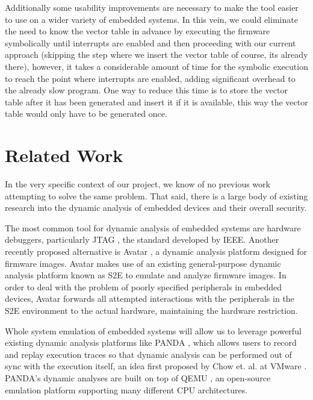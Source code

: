 \documentclass[letterpaper, 10 pt, conference]{ieeeconf}
\begin{document}
Additionally some usability improvements are necessary to make the tool easier to use on a wider variety of embedded systems. In this vein, we could eliminate the need to know the vector table in advance by executing the firmware symbolically until interrupts are enabled and then proceeding with our current approach (skipping the step where we insert the vector table of course, its already there), however, it takes a considerable amount of time for the symbolic execution to reach the point where interrupts are enabled, adding significant overhead to the already slow program. One way to reduce this time is to store the vector table after it has been generated and insert it if it is available, this way the vector table would only have to be generated once.

\section{Related Work} %
In the very specific context of our project, we know of no previous work attempting to solve the same problem. That said, there is a large body of existing research into the dynamic analysis of embedded devices and their overall security.

The most common tool for dynamic analysis of embedded systems are hardware debuggers, particularly JTAG \cite{jtag}, the standard developed by IEEE. Another recently proposed alternative is Avatar \cite{avatar}, a dynamic analysis platform designed for firmware images. Avatar makes use of an existing general-purpose dynamic analysis platform known as S2E \cite{s2e} to emulate and analyze firmware images. In order to deal with the problem of poorly specified peripherals in embedded devices, Avatar forwards all attempted interactions with the peripherals in the S2E environment to the actual hardware, maintaining the hardware restriction. 

Whole system emulation of embedded systems will allow us to leverage powerful existing dynamic analysis platforms like PANDA \cite{panda}, which allows users to record and replay execution traces so that dynamic analysis can be performed out of sync with the execution itself, an idea first proposed by Chow et. al. at VMware \cite{jchow}. PANDA's dynamic analyses are built on top of QEMU \cite{qemu}, an open-source emulation platform supporting many different CPU architectures. 
\end{document}
